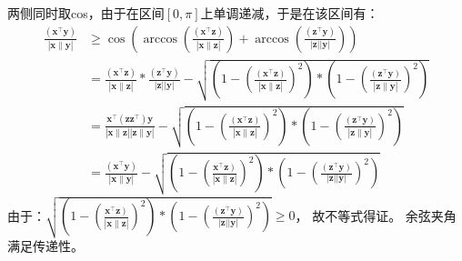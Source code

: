 \documentclass[UTF8,a4paper,AutoFakeBold,AutoFakeSlant]{article}
\begin{document}
两侧同时取cos，由于在区间$[0,\pi]$上单调递减，于是在该区间有：
\begin{equation*}
  \begin{aligned}
    \frac{\left(\boldsymbol{x}^{\top} \boldsymbol{y}\right)}{|\boldsymbol{x} \| \boldsymbol{y}|} & \geq \cos \left(\arccos \left(\frac{\left(\boldsymbol{x}^{\top} \boldsymbol{z}\right)}{|\boldsymbol{x} \| \boldsymbol{z}|}\right)+\arccos \left(\frac{\left(\boldsymbol{z}^{\top} \boldsymbol{y}\right)}{|\boldsymbol{z}||\boldsymbol{y}|}\right)\right)                                                                                                                                                                                                      \\
                                                                                                 & = \frac{\left(\boldsymbol{x}^{\top} \boldsymbol{z}\right)}{|\boldsymbol{x} \| \boldsymbol{z}|} * \frac{\left(\boldsymbol{z}^{\top} \boldsymbol{y}\right)}{|\boldsymbol{z}||\boldsymbol{y}|}-\sqrt{\left(1-\left(\frac{\left(\boldsymbol{x}^{\top} \boldsymbol{z}\right)}{|\boldsymbol{x} \| \boldsymbol{z}|}\right)^{2}\right) *\left(1-\left(\frac{\left(\boldsymbol{z}^{\top} \boldsymbol{y}\right)}{|\boldsymbol{z} \| \boldsymbol{y}|}\right)^{2}\right)} \\
                                                                                                 & = \frac{\boldsymbol{x}^{\top}\left(\boldsymbol{z} \boldsymbol{z}^{\top}\right) \boldsymbol{y}}{|\boldsymbol{x}\|\boldsymbol{z}|| \boldsymbol{z}\| \boldsymbol{y}|}-\sqrt{\left(1-\left(\frac{\left(\boldsymbol{x}^{\top} \boldsymbol{z}\right)}{|\boldsymbol{x} \| \boldsymbol{z}|}\right)^{2}\right) *\left(1-\left(\frac{\left(\boldsymbol{z}^{\top} \boldsymbol{y}\right)}{|\boldsymbol{z} \| \boldsymbol{y}|}\right)^{2}\right)}                          \\
                                                                                                 & = \frac{\left(\boldsymbol{x}^{\top} \boldsymbol{y}\right)}{|\boldsymbol{x} \| \boldsymbol{y}|}-\sqrt{\left(1-\left(\frac{\left.\boldsymbol{x}^{\top} \boldsymbol{z}\right)}{|\boldsymbol{x} \| \boldsymbol{z}|}\right)^{2}\right) *\left(1-\left(\frac{\left(\boldsymbol{z}^{\top} \boldsymbol{y}\right)}{|\boldsymbol{z}||\boldsymbol{y}|}\right)^{2}\right)}
  \end{aligned}
\end{equation*}
由于：$ \sqrt{\left(1-\left(\frac{\left.\boldsymbol{x}^{\top} \boldsymbol{z}\right)}{|\boldsymbol{x} \| \boldsymbol{z}|}\right)^{2}\right) *\left(1-\left(\frac{\left(\boldsymbol{z}^{\top} \boldsymbol{y}\right)}{|\boldsymbol{z}||\boldsymbol{y}|}\right)^{2}\right)} \geq 0 $，
故不等式得证。
余弦夹角满足传递性。
\end{document}
